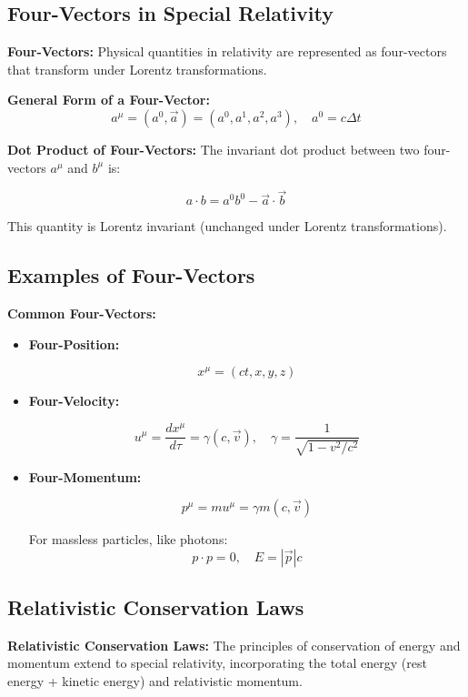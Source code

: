 \documentclass{article}
\newcommand{\eqbox}[1]{\begin{tcolorbox}[colback=gray!10] #1 \end{tcolorbox}}
\newcommand{\conceptbox}[1]{\begin{tcolorbox}[colback=blue!10] #1 \end{tcolorbox}}
\begin{document}
\subsection{Four-Vectors in Special Relativity}
\conceptbox{
\textbf{Four-Vectors:}
Physical quantities in relativity are represented as four-vectors that transform under Lorentz transformations.
}
\eqbox{
\textbf{General Form of a Four-Vector:}
\[
a^\mu = (a^0, \vec{a}) = (a^0, a^1, a^2, a^3), \quad a^0 = c\Delta t
\]
}
\conceptbox{
\textbf{Dot Product of Four-Vectors:}
The invariant dot product between two four-vectors \( a^\mu \) and \( b^\mu \) is:
\eqbox{
\[
a \cdot b = a^0 b^0 - \vec{a} \cdot \vec{b}
\]
}
This quantity is Lorentz invariant (unchanged under Lorentz transformations).
}

\subsection{Examples of Four-Vectors}
\conceptbox{
\textbf{Common Four-Vectors:}
\begin{itemize}
    \item \textbf{Four-Position:} 
    \eqbox{
    \[
    x^\mu = (ct, x, y, z)
    \]
    }
    \item \textbf{Four-Velocity:} 
    \eqbox{
    \[
    u^\mu = \frac{dx^\mu}{d\tau} = \gamma (c, \vec{v}), \quad \gamma = \frac{1}{\sqrt{1 - v^2/c^2}}
    \]
    }
    \item \textbf{Four-Momentum:} 
    \eqbox{
    \[
    p^\mu = m u^\mu = \gamma m (c, \vec{v})
    \]
    }
    \eqbox{
    For massless particles, like photons:
    \[
    p \cdot p = 0, \quad E = |\vec{p}|c
    \]
    }
\end{itemize}
}

\subsection{Relativistic Conservation Laws}

\conceptbox{
\textbf{Relativistic Conservation Laws:}
The principles of conservation of energy and momentum extend to special relativity, incorporating the total energy (rest energy + kinetic energy) and relativistic momentum.
}
\end{document}
